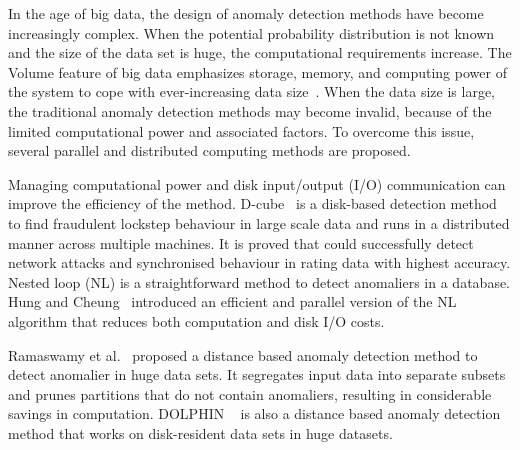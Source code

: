 In the age of big data,
the design of anomaly detection methods have become increasingly complex.
When the potential probability distribution is not
known and the size of the data set is huge,
the computational requirements increase.
The Volume feature of big data emphasizes storage,
memory,
and computing power of the system to
cope with ever-increasing data size~\cite{gadepally2014big}.
When the data size is large,
the traditional anomaly detection methods may become invalid,
because of the limited computational power and associated factors.
To overcome this issue,
several parallel and distributed computing methods are proposed.

Managing computational power and disk input/output (I/O) communication can
improve the efficiency of the method.
D-cube~\cite{shin2017d} is a disk-based detection method to
find fraudulent lockstep behaviour in large scale data and
runs in a distributed manner across multiple machines.
It is proved that could successfully
detect network attacks and
synchronised behaviour in rating data
with highest accuracy.
Nested loop (NL)\cite{knox1998algorithms} is
a straightforward method to detect anomaliers in a database.
Hung and Cheung~\cite{hung2002parallel} introduced an
efficient and parallel version
of the NL algorithm that reduces both computation and disk I/O costs.

Ramaswamy et al.~\cite{ramaswamy2000efficient} proposed a
distance based  anomaly detection method to detect anomalier in huge data sets.
It segregates input data into
separate subsets and prunes partitions that
do not contain anomaliers,
resulting in considerable
savings in computation.
DOLPHIN ~\cite{angiulli2007very} is also a
distance based anomaly detection method
that works on disk-resident data sets in huge datasets.

